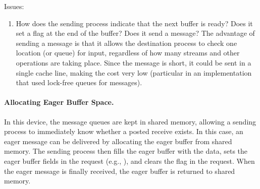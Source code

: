 Issues:
\begin{enumerate}
\item How does the sending process indicate that the next buffer is ready?
  Does it set a flag at the end of the buffer?  Does it send a message?  The
  advantage of sending a message is that it allows the destination process to
  check one location (or queue) for input, regardless of how many streams and
  other operations are taking place.  Since the message is short, it could be
  sent in a single cache line, making the cost very low (particular in an
  implementation that used lock-free queues for messages).  

\end{enumerate}

\paragraph{Allocating Eager Buffer Space.}
In this device, the message queues are kept in shared memory, allowing a
sending process to immediately know whether a posted receive exists.  In this
case, an eager message can be delivered by allocating the eager buffer from
shared memory.  The sending process then fills the eager buffer with the data,
sets the eager buffer fields in the request (e.g., ),
and clears the  flag in the request.  When the eager message is
finally received, the eager buffer is returned to shared memory.


